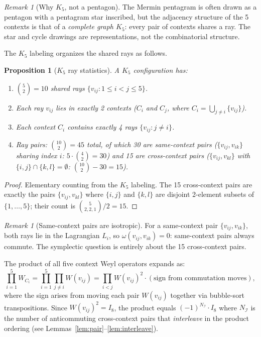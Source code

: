 \documentclass[11pt,a4paper]{article}
\newtheorem{proposition}[theorem]{Proposition}
\theoremstyle{remark}
\newtheorem{remark}[theorem]{Remark}
\begin{document}
\begin{remark}[Why $K_5$, not a pentagon]
The Mermin pentagram is often drawn as a pentagon with a pentagram star
inscribed, but the adjacency structure of the 5 contexts is that of a
\emph{complete graph $K_5$}: every pair of contexts shares a ray.
The star and cycle drawings are representations, not the combinatorial
structure.
\end{remark}

The $K_5$ labeling organizes the shared rays as follows.

\begin{proposition}[$K_5$ ray statistics]\label{prop:k5rays}
A $K_5$ configuration has:
\begin{enumerate}
  \item $\binom{5}{2} = 10$ shared rays $\{v_{ij} : 1 \leq i < j \leq 5\}$.
  \item Each ray $v_{ij}$ lies in exactly 2 contexts
        ($C_i$ and $C_j$, where $C_i = \bigcup_{j \neq i} \{v_{ij}\}$).
  \item Each context $C_i$ contains exactly 4 rays
        $\{v_{ij} : j \neq i\}$.
  \item Ray pairs: $\binom{10}{2} = 45$ total,
        of which 30 are \emph{same-context pairs}
        ($\{v_{ij}, v_{ik}\}$ sharing index $i$: $5 \cdot \binom{4}{2} = 30$)
        and 15 are \emph{cross-context pairs}
        ($\{v_{ij}, v_{kl}\}$ with $\{i,j\} \cap \{k,l\} = \emptyset$:
        $\binom{10}{2} - 30 = 15$).
\end{enumerate}
\end{proposition}

\begin{proof}
Elementary counting from the $K_5$ labeling.
The 15 cross-context pairs are exactly the pairs
$\{v_{ij}, v_{kl}\}$ where $\{i,j\}$ and $\{k,l\}$ are disjoint
2-element subsets of $\{1,\ldots,5\}$; their count is
$\binom{5}{2,2,1}/2 = 15$.
\end{proof}

\begin{remark}[Same-context pairs are isotropic]\label{rem:sameiso}
For a same-context pair $\{v_{ij}, v_{ik}\}$, both rays lie in
the Lagrangian $L_i$, so $\omega(v_{ij}, v_{ik}) = 0$:
same-context pairs always commute.
The symplectic question is entirely about the 15 cross-context pairs.
\end{remark}

The product of all five context Weyl operators expands as:
\begin{equation}\label{eq:expand}
  \prod_{i=1}^5 W_{C_i}
  = \prod_{i=1}^5 \prod_{j \neq i} W(v_{ij})
  = \prod_{i < j} W(v_{ij})^2 \cdot (\text{sign from commutation moves}),
\end{equation}
where the sign arises from moving each pair $W(v_{ij})$ together
via bubble-sort transpositions.
Since $W(v_{ij})^2 = I_8$, the product equals $(-1)^{N_\mathcal{I}} \cdot I_8$
where $N_\mathcal{I}$ is the number of anticommuting cross-context pairs
that \emph{interleave} in the product ordering
(see Lemmas~\ref{lem:pair}--\ref{lem:interleave}).
\end{document}
